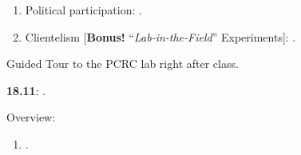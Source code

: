 \documentclass[letterpaper]{article}
\renewenvironment{itemize}{
  \begin{list}{}{
    \setlength{\leftmargin}{1.5em}
  }
}{
  \end{list}
}
\begin{document}
\begin{enumerate}
\begin{itemize}
\begin{enumerate}
          \item[$\bullet$] Political participation: \href{https://onlinelibrary.wiley.com/doi/pdf/10.1111/j.1540-5907.2008.00332.x}{}.


          \item[$\bullet$] Clientelism [{\bf Bonus!} ``\emph{Lab-in-the-Field}'' Experiments]: \href{https://doi.org/10.1177/0010414017695336}{}.


         \end{enumerate}

      \end{itemize}

             \item[{\color{red}$\diamond$}] {\color{red}Guided Tour to the PCRC lab right after class}.


  \item {\bf 18.11}:  {\color{ForestGreen}{\bf Natural Experiments}}.


      \begin{itemize} 

        \item[$\diamond$] Overview:

        \begin{enumerate}



          \item[$\bullet$] \href{https://doi.org/10.1017/CBO9781139084444}{}. %



\end{enumerate}
\end{itemize}
\end{enumerate}
\end{document}
